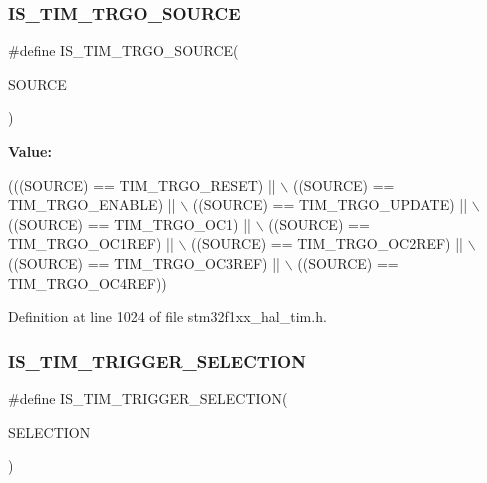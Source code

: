 \subsubsection{\texorpdfstring{I\+S\+\_\+\+T\+I\+M\+\_\+\+T\+R\+G\+O\+\_\+\+S\+O\+U\+R\+CE}{IS\_TIM\_TRGO\_SOURCE}}
{\footnotesize\ttfamily \#define I\+S\+\_\+\+T\+I\+M\+\_\+\+T\+R\+G\+O\+\_\+\+S\+O\+U\+R\+CE(\begin{DoxyParamCaption}\item[{}]{S\+O\+U\+R\+CE }\end{DoxyParamCaption})}

{\bfseries Value\+:}
\begin{DoxyCode}
(((SOURCE) == TIM\_TRGO\_RESET)  || \(\backslash\)
                                    ((SOURCE) == TIM\_TRGO\_ENABLE) || \(\backslash\)
                                    ((SOURCE) == TIM\_TRGO\_UPDATE) || \(\backslash\)
                                    ((SOURCE) == TIM\_TRGO\_OC1)    || \(\backslash\)
                                    ((SOURCE) == TIM\_TRGO\_OC1REF) || \(\backslash\)
                                    ((SOURCE) == TIM\_TRGO\_OC2REF) || \(\backslash\)
                                    ((SOURCE) == TIM\_TRGO\_OC3REF) || \(\backslash\)
                                    ((SOURCE) == TIM\_TRGO\_OC4REF))
\end{DoxyCode}


Definition at line 1024 of file stm32f1xx\+\_\+hal\+\_\+tim.\+h.

\mbox{\label{group___t_i_m___private___macros_ga36e47cf625c695a368a68280e950dfbc}} 
\subsubsection{\texorpdfstring{I\+S\+\_\+\+T\+I\+M\+\_\+\+T\+R\+I\+G\+G\+E\+R\+\_\+\+S\+E\+L\+E\+C\+T\+I\+ON}{IS\_TIM\_TRIGGER\_SELECTION}}
{\footnotesize\ttfamily \#define I\+S\+\_\+\+T\+I\+M\+\_\+\+T\+R\+I\+G\+G\+E\+R\+\_\+\+S\+E\+L\+E\+C\+T\+I\+ON(\begin{DoxyParamCaption}\item[{}]{S\+E\+L\+E\+C\+T\+I\+ON }\end{DoxyParamCaption})}

